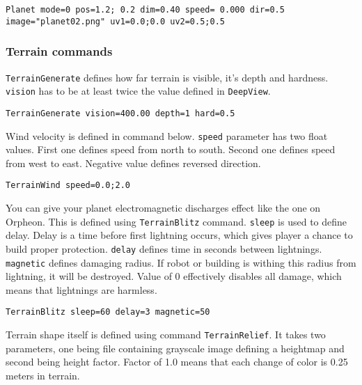\begin{lstlisting}[style=scene]
Planet mode=0 pos=1.2; 0.2 dim=0.40 speed= 0.000 dir=0.5 image="planet02.png" uv1=0.0;0.0 uv2=0.5;0.5
\end{lstlisting}


\subsubsection{Terrain commands}

\texttt{TerrainGenerate} defines how far terrain is visible, it's depth and hardness. \texttt{vision} has to be at least twice the value defined in \texttt{DeepView}.

\begin{lstlisting}[style=scene]
TerrainGenerate vision=400.00 depth=1 hard=0.5
\end{lstlisting}

Wind velocity is defined in command below. \texttt{speed} parameter has two float values. First one defines speed from north to south. Second one defines speed from west to east. Negative value defines reversed direction.

\begin{lstlisting}[style=scene]
TerrainWind speed=0.0;2.0
\end{lstlisting}


You can give your planet electromagnetic discharges effect like the one on Orpheon. This is defined using \texttt{TerrainBlitz} command. \texttt{sleep} is used to define delay. Delay is a time before first lightning occurs, which gives player a chance to build proper protection. \texttt{delay} defines time in seconds between lightnings. \texttt{magnetic} defines damaging radius. If robot or building is withing this radius from lightning, it will be destroyed. Value of 0 effectively disables all damage, which means that lightnings are harmless.

\begin{lstlisting}[style=scene]
TerrainBlitz sleep=60 delay=3 magnetic=50
\end{lstlisting}

Terrain shape itself is defined using command \texttt{TerrainRelief}. It takes two parameters, one being file containing grayscale image defining a heightmap and second being height factor. Factor of 1.0 means that each change of color is 0.25 meters in terrain.

